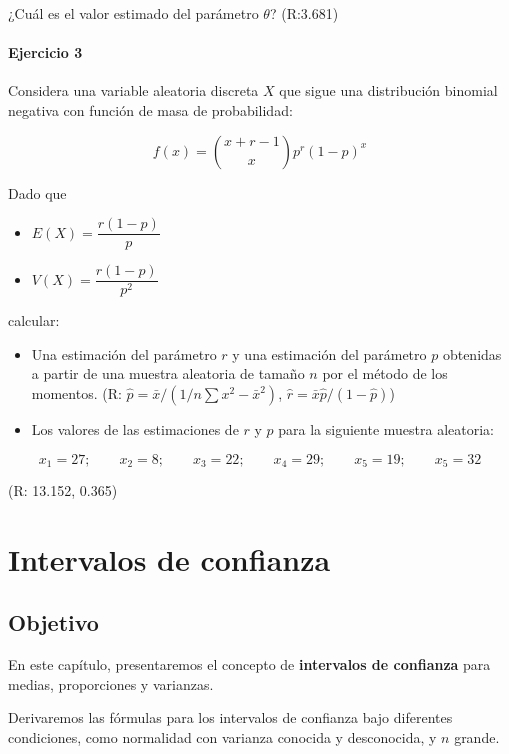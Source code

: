 \documentclass[
]{book}
\providecommand{\tightlist}{%
  \setlength{\itemsep}{0pt}\setlength{\parskip}{0pt}}
\begin{document}
¿Cuál es el valor estimado del parámetro \(\theta\)? (R:3.681)

\hypertarget{ejercicio-3-7}{%
\subsubsection{Ejercicio 3}\label{ejercicio-3-7}}

Considera una variable aleatoria discreta \(X\) que sigue una distribución binomial negativa con función de masa de probabilidad:

\[f(x) = \binom{x+r-1}{x}p^r(1-p)^x\]

Dado que

\begin{itemize}
\tightlist
\item
  \(E(X)=\dfrac{r(1-p)}{p}\)
\item
  \(V(X) =\dfrac{r(1-p)}{p^2}\)
\end{itemize}

calcular:

\begin{itemize}
\item
  Una estimación del parámetro \(r\) y una estimación del parámetro \(p\) obtenidas a partir de una muestra aleatoria de tamaño \(n\) por el método de los momentos. (R: \(\hat{p}=\bar{x}/({1/n \sum x^2}-\bar{x}^2)\), \(\hat{r}=\bar{x}\hat{p}/(1-\hat{p})\))
\item
  Los valores de las estimaciones de \(r\) y \(p\) para la siguiente muestra aleatoria:
\end{itemize}

\[x_1 = 27; \qquad   x_2 = 8; \qquad   x_3 = 22; \qquad   x_4 = 29; \qquad   x_5 = 19; \qquad   x_5 = 32\]

(R: 13.152, 0.365)

\hypertarget{intervalos-de-confianza}{%
\chapter{Intervalos de confianza}\label{intervalos-de-confianza}}

\hypertarget{objetivo-9}{%
\section{Objetivo}\label{objetivo-9}}

En este capítulo, presentaremos el concepto de \textbf{intervalos de confianza} para medias, proporciones y varianzas.

Derivaremos las fórmulas para los intervalos de confianza bajo diferentes condiciones, como normalidad con varianza conocida y desconocida, y \(n\) grande.
\end{document}

